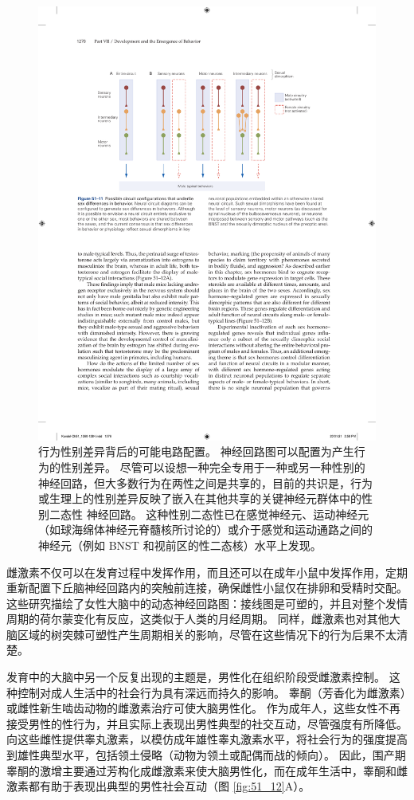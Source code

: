 \begin{figure}[htbp]
	\centering
	\includegraphics[width=0.8\linewidth]{chap51/fig_51_11}
	\caption{行为性别差异背后的可能电路配置。 神经回路图可以配置为产生行为的性别差异。 尽管可以设想一种完全专用于一种或另一种性别的神经回路，但大多数行为在两性之间是共享的，目前的共识是，行为或生理上的性别差异反映了嵌入在其他共享的关键神经元群体中的性别二态性 神经回路。 这种性别二态性已在感觉神经元、运动神经元（如球海绵体神经元脊髓核所讨论的）或介于感觉和运动通路之间的神经元（例如 BNST 和视前区的性二态核）水平上发现。}
	\label{fig:51_11}
\end{figure}

雌激素不仅可以在发育过程中发挥作用，而且还可以在成年小鼠中发挥作用，定期重新配置下丘脑神经回路内的突触前连接，确保雌性小鼠仅在排卵和受精时交配。 这些研究描绘了女性大脑中的动态神经回路图：接线图是可塑的，并且对整个发情周期的荷尔蒙变化有反应，这类似于人类的月经周期。 同样，雌激素也对其他大脑区域的树突棘可塑性产生周期相关的影响，尽管在这些情况下的行为后果不太清楚。

发育中的大脑中另一个反复出现的主题是，男性化在组织阶段受雌激素控制。 这种控制对成人生活中的社会行为具有深远而持久的影响。 睾酮（芳香化为雌激素）或雌性新生啮齿动物的雌激素治疗可使大脑男性化。 作为成年人，这些女性不再接受男性的性行为，并且实际上表现出男性典型的社交互动，尽管强度有所降低。 向这些雌性提供睾丸激素，以模仿成年雄性睾丸激素水平，将社会行为的强度提高到雄性典型水平，包括领土侵略（动物为领土或配偶而战的倾向）。 因此，围产期睾酮的激增主要通过芳构化成雌激素来使大脑男性化，而在成年生活中，睾酮和雌激素都有助于表现出典型的男性社会互动（图 \ref{fig:51_12}A）。

